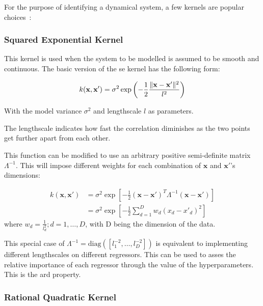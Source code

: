 For the purpose of identifying a dynamical system, a few kernels are popular
choices~\cite{kocijanModellingControlDynamic2016}: 


\subsubsection*{Squared Exponential Kernel}

This kernel is used when the system to be modelled is assumed to be smooth and
continuous. The basic version of the \acrshort{se} kernel has the following form:

\begin{equation}
    k(\mathbf{x}, \mathbf{x'}) = \sigma^2 \exp{\left(- \frac{1}{2}\frac{\lVert\mathbf{x} -
    \mathbf{x'}\rVert^2}{l^2}\right)}
\end{equation}

With the model variance $\sigma^2$ and lengthscale $l$ as parameters.

The lengthscale indicates how fast the correlation diminishes as the two points
get further apart from each other.

This function can be modified to use an arbitrary positive semi-definite matrix
$\Lambda^{-1}$.
This will impose different weights for each combination of $\mathbf{x}$ and
$\mathbf{x'}$'s dimensions:

\begin{equation}
    \begin{aligned}
        k(\mathbf{x}, \mathbf{x'})
        &= \sigma^2\exp{\left[-\frac{1}{2} (\mathbf{x} - \mathbf{x'})^T \Lambda^{-1}
        (\mathbf{x} - \mathbf{x'})\right]} \\
        &= \sigma^2 \exp{\left[-\frac{1}{2}\sum_{d=1}^D w_d(x_d - x'_d)^2\right]}
    \end{aligned}
\end{equation}
where $w_d = \frac{1}{l_d^2}; d = 1 ,\dots, D$, with D being the dimension of the
data.

This special case of $\Lambda^{-1} = \text{diag}{\left([l_1^{-2},\dots,l_D^{-2}]\right)}$
is equivalent to implementing different lengthscales on different regressors.
This can be used to asses the relative importance of each regressor through the
value of the hyperparameters. This is the \acrfull{ard} property.


\subsubsection*{Rational Quadratic Kernel}


